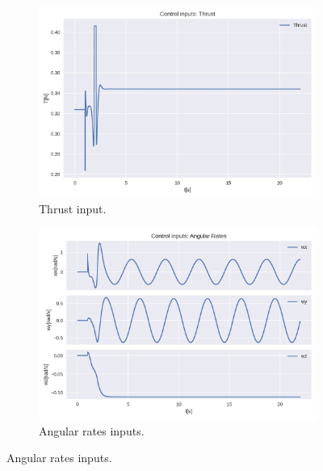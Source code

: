 \documentclass{thesisreport}
\begin{document}
\begin{figure}[H]
\medskip
	\begin{subfigure}{0.45\textwidth}
		\includegraphics[width=\linewidth]{Images/acados_simulations/circular_trajectory/3D_quadrotor/thrustInput.png}
		\caption{Thrust input.} \label{fig:3D_sim_thrust_input}
	\end{subfigure}\hspace*{\fill}
	\begin{subfigure}{0.45\textwidth}
		\includegraphics[width=\linewidth]{Images/acados_simulations/circular_trajectory/3D_quadrotor/angulareRatesInputs.png}
		\caption{Angular rates inputs.} \label{fig:3D_sim_rates_input}
	\end{subfigure}
	

\end{figure}
\end{document}
